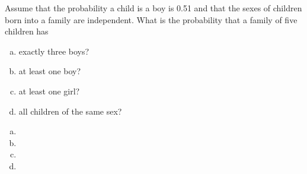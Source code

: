 \documentclass[../main.tex]{subfiles}
\begin{document}
Assume that the probability a child is a boy is 0.51 and that the sexes of children born into a family are independent.
What is the probability that a family of five children has
\begin{enumerate}[a)]
	\item exactly three boys?
	\item at least one boy?
	\item at least one girl?
	\item all children of the same sex?
\end{enumerate}

\solution
\begin{enumerate}[a)]
	\item 
	\item 
	\item 
	\item 
\end{enumerate}
\end{document}
